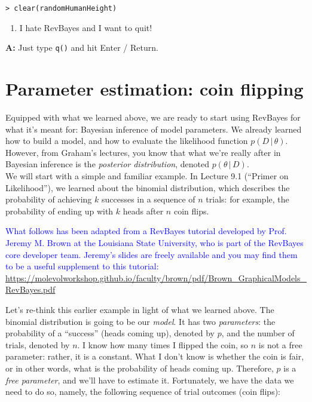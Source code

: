 \documentclass[12pt]{article}
\begin{document}
\indent \texttt{> clear(randomHumanHeight)} \\

{\large
\begin{enumerate}\bfseries
\setcounter{enumi}{2}
\item I hate RevBayes and I want to quit!
\end{enumerate}
}

\noindent \textbf{A:} Just type \texttt{q()} and hit Enter / Return.

\section*{Parameter estimation: coin flipping}

Equipped with what we learned above, we are ready to start using RevBayes for what it's meant for: Bayesian inference of model parameters. We already learned how to build a model, and how to evaluate the likelihood function $p(D \, | \, \theta)$. However, from Graham's lectures, you know that what we're really after in Bayesian inference is the \textit{posterior distribution}, denoted $p(\theta \, | \, D)$. \\

\noindent We will start with a simple and familiar example. In Lecture 9.1 (``Primer on Likelihood''), we learned about the binomial distribution, which describes the probability of achieving $k$ successes in a sequence of $n$ trials: for example, the probability of ending up with $k$ heads after $n$ coin flips.

\begin{center}
\textcolor{blue}{What follows has been adapted from a RevBayes tutorial developed by Prof. Jeremy M. Brown at the Louisiana State University, who is part of the RevBayes core developer team. Jeremy's slides are freely available and you may find them to be a useful supplement to this tutorial: \\
\url{https://molevolworkshop.github.io/faculty/brown/pdf/Brown\_GraphicalModels\_RevBayes.pdf}}
\end{center}

\noindent Let's re-think this earlier example in light of what we learned above. The binomial distribution is going to be our \textit{model}. It has two \textit{parameters}: the probability of a ``success'' (heads coming up), denoted by $p$, and the number of trials, denoted by $n$. I know how many times I flipped the coin, so $n$ is not a free parameter: rather, it is a constant. What I don't know is whether the coin is fair, or in other words, what is the probability of heads coming up. Therefore, $p$ is a \textit{free parameter}, and we'll have to estimate it. Fortunately, we have the data we need to do so, namely, the following sequence of trial outcomes (coin flips):
\end{document}
